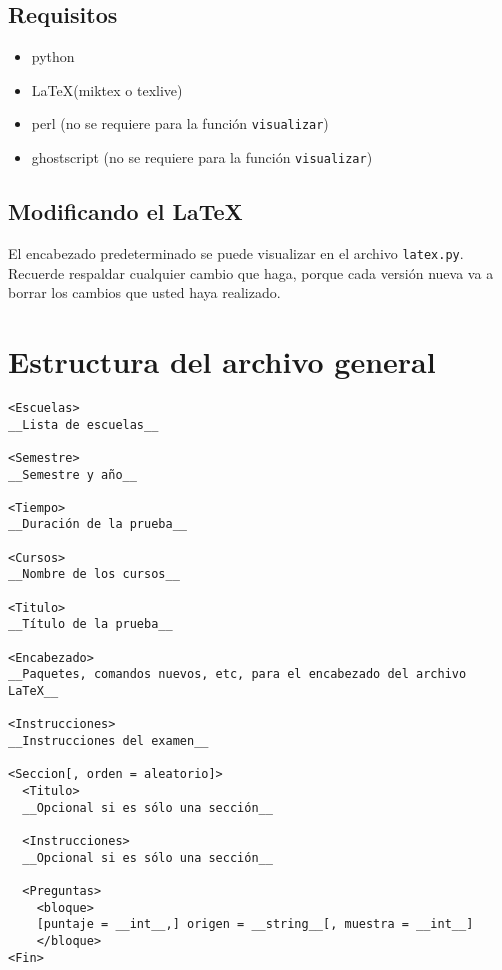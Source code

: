 \documentclass[12pt]{article}
\theoremstyle{definition}
\begin{document}
\subsection{Requisitos}
\begin{itemize}
  \item python
  \item \LaTeX (miktex o texlive)
  \item perl (no se requiere para la funci\'on \verb|visualizar|)
  \item ghostscript (no se requiere para la funci\'on \verb|visualizar|)
\end{itemize}

\subsection{Modificando el \LaTeX}
El encabezado predeterminado se puede visualizar en el archivo \verb|latex.py|. Recuerde respaldar cualquier cambio que haga, porque cada versi\'on nueva va a borrar los cambios que usted haya realizado.

\section{Estructura del archivo general}
\begin{verbatim}
<Escuelas>
__Lista de escuelas__

<Semestre>
__Semestre y año__

<Tiempo>
__Duración de la prueba__

<Cursos>
__Nombre de los cursos__

<Titulo>
__Título de la prueba__

<Encabezado>
__Paquetes, comandos nuevos, etc, para el encabezado del archivo LaTeX__

<Instrucciones>
__Instrucciones del examen__

<Seccion[, orden = aleatorio]>
  <Titulo>
  __Opcional si es sólo una sección__

  <Instrucciones>
  __Opcional si es sólo una sección__

  <Preguntas>
    <bloque>
    [puntaje = __int__,] origen = __string__[, muestra = __int__]
    </bloque>
<Fin>
\end{verbatim}
\end{document}
